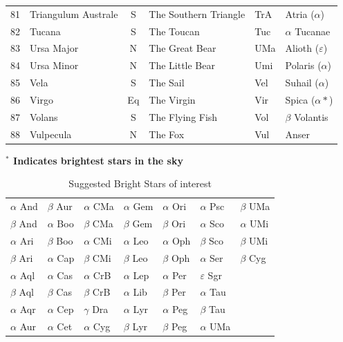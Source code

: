 \documentclass[a4paper,12pt]{extarticle}
\begin{document}
\begin{table}[H]
\begin{tabular}{llclll}
81                         & Triangulum Australe                  & S                               & The Southern Triangle                  & TrA                         & Atria ($\alpha$)  \\
82 & Tucana     & S  & The Toucan      & Tuc & $\alpha$ Tucanae       \\
83 & Ursa Major & N  & The Great Bear  & UMa & Alioth ($\varepsilon$) \\
84 & Ursa Minor & N  & The Little Bear & Umi & Polaris ($\alpha$)     \\
85 & Vela       & S  & The Sail        & Vel & Suhail ($\alpha$)      \\
86 & Virgo      & Eq & The Virgin      & Vir & Spica ($\alpha \ast$)  \\
87 & Volans     & S  & The Flying Fish & Vol & $\beta$ Volantis       \\
88 & Vulpecula  & N  & The Fox         & Vul & Anser 
\end{tabular}
\end{table}

\textbf{$^\ast$ Indicates brightest stars in the sky}

\begin{table}[H]
\centering
\begin{tabular}{lllllll}
$\alpha$ And                & $\beta$ Aur  & $\alpha$ CMa  & $\alpha$ Gem & $\alpha$ Ori & $\alpha$ Psc      & $\beta$ UMa   \\
$\beta$ And                 & $\alpha$ Boo & $\beta$ CMa   & $\beta$ Gem  & $\beta$ Ori  & $\alpha$ Sco      & $\alpha$ UMi \\
$\alpha$ Ari                & $\beta$ Boo  & $\alpha$ CMi  & $\alpha$ Leo & $\alpha$ Oph & $\beta$ Sco       & $\beta$ UMi  \\
$\beta$ Ari                 & $\alpha$ Cap & $\beta$ CMi   & $\beta$ Leo  & $\beta$ Oph  & $\alpha$ Ser      & $\beta$ Cyg  \\
$\alpha$ Aql                & $\alpha$ Cas & $\alpha$ CrB  & $\alpha$ Lep & $\alpha$ Per & $\varepsilon$ Sgr &              \\
$\beta$ Aql                 & $\beta$ Cas  & $\beta$ CrB   & $\alpha$ Lib & $\beta$ Per  & $\alpha$ Tau      &              \\
$\alpha$ Aqr                & $\alpha$ Cep & $\gamma$  Dra & $\alpha$ Lyr & $\alpha$ Peg & $\beta$ Tau       &              \\
$\alpha$ Aur & $\alpha$ Cet & $\alpha$ Cyg  & $\beta$ Lyr  & $\beta$ Peg  & $\alpha$ UMa      &             
\end{tabular}
\caption{Suggested Bright Stars of interest}
\end{table}
\end{document}
